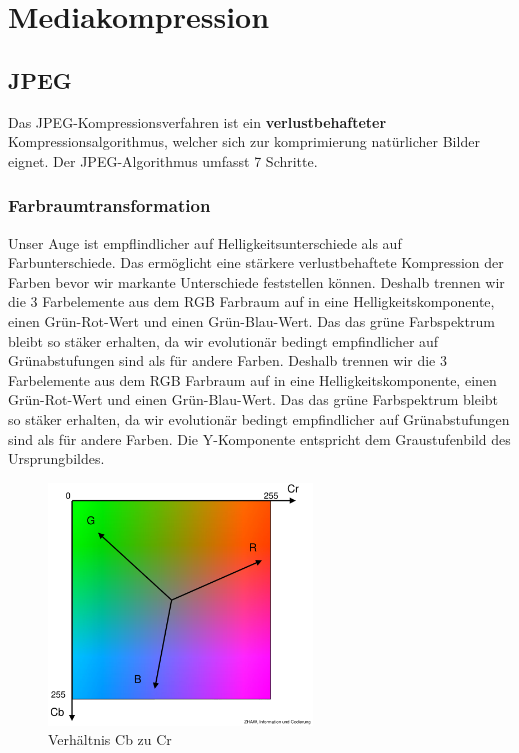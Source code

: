 \documentclass{article}
\begin{document}
\section{Mediakompression}
\subsection{JPEG}
Das JPEG-Kompressionsverfahren ist ein \textbf{verlustbehafteter} Kompressionsalgorithmus, welcher sich zur komprimierung natürlicher Bilder eignet. Der JPEG-Algorithmus umfasst 7 Schritte.
\subsubsection{Farbraumtransformation}
Unser Auge ist empflindlicher auf Helligkeitsunterschiede als auf Farbunterschiede. Das ermöglicht eine stärkere verlustbehaftete Kompression der Farben bevor wir markante Unterschiede feststellen können. Deshalb trennen wir die 3 Farbelemente aus dem RGB Farbraum auf in eine Helligkeitskomponente, einen Grün-Rot-Wert und einen Grün-Blau-Wert. Das das grüne Farbspektrum bleibt so stäker erhalten, da wir evolutionär bedingt empfindlicher auf Grünabstufungen sind als für andere Farben. Deshalb trennen wir die 3 Farbelemente aus dem RGB Farbraum auf in eine Helligkeitskomponente, einen Grün-Rot-Wert und einen Grün-Blau-Wert. Das das grüne Farbspektrum bleibt so stäker erhalten, da wir evolutionär bedingt empfindlicher auf Grünabstufungen sind als für andere Farben.
Die Y-Komponente entspricht dem Graustufenbild des Ursprungbildes.
\begin{figure}[h!]
		\begin{center}
		\includegraphics[width=7cm]{img/cbcr.png}
		\end{center}
		\caption{Verhältnis Cb zu Cr}
		\label{fig:Verhältnis Cb zu Cr}
\end{figure}
\end{document}
